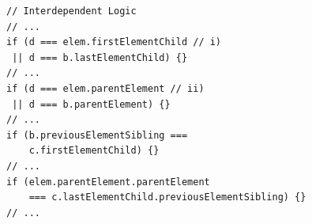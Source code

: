 
\begin{figure}
\begin{lstlisting}[caption=Example code showing DOM operations can have logical constraints that are interdependent with each other.  To make both of these {\tt if} statements true sub conditions i) and ii) become mutually exclusive: they cannot be true at the same time.  Thus a logic solver is required to generate a satisfiable DOM structure and HTML.,label=domOr]  
// Interdependent Logic
// ...
if (d === elem.firstElementChild // i)
 || d === b.lastElementChild) {}
// ... 
if (d === elem.parentElement // ii)
 || d === b.parentElement) {}
// ...
if (b.previousElementSibling === 
    c.firstElementChild) {}
// ... 
if (elem.parentElement.parentElement 
    === c.lastElementChild.previousElementSibling) {}  
// ... 
\end{lstlisting}
\end{figure}


